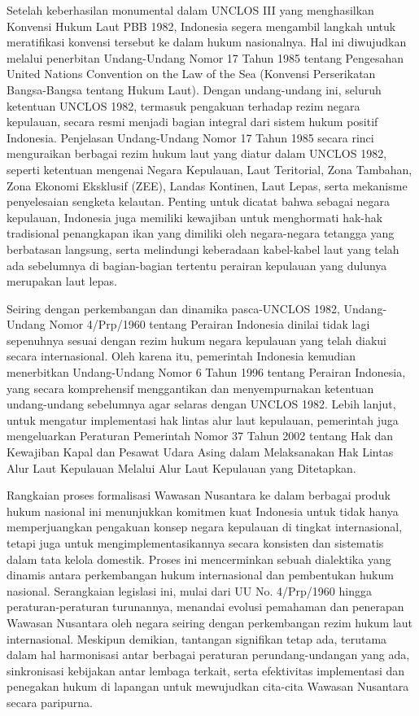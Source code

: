 \documentclass[12pt, a4paper]{article}
\begin{document}
Setelah keberhasilan monumental dalam UNCLOS III yang menghasilkan Konvensi Hukum Laut PBB 1982, Indonesia segera mengambil langkah untuk meratifikasi konvensi tersebut ke dalam hukum nasionalnya. Hal ini diwujudkan melalui penerbitan Undang-Undang Nomor 17 Tahun 1985 tentang Pengesahan United Nations Convention on the Law of the Sea (Konvensi Perserikatan Bangsa-Bangsa tentang Hukum Laut). Dengan undang-undang ini, seluruh ketentuan UNCLOS 1982, termasuk pengakuan terhadap rezim negara kepulauan, secara resmi menjadi bagian integral dari sistem hukum positif Indonesia. Penjelasan Undang-Undang Nomor 17 Tahun 1985 secara rinci menguraikan berbagai rezim hukum laut yang diatur dalam UNCLOS 1982, seperti ketentuan mengenai Negara Kepulauan, Laut Teritorial, Zona Tambahan, Zona Ekonomi Eksklusif (ZEE), Landas Kontinen, Laut Lepas, serta mekanisme penyelesaian sengketa kelautan. Penting untuk dicatat bahwa sebagai negara kepulauan, Indonesia juga memiliki kewajiban untuk menghormati hak-hak tradisional penangkapan ikan yang dimiliki oleh negara-negara tetangga yang berbatasan langsung, serta melindungi keberadaan kabel-kabel laut yang telah ada sebelumnya di bagian-bagian tertentu perairan kepulauan yang dulunya merupakan laut lepas.  

Seiring dengan perkembangan dan dinamika pasca-UNCLOS 1982, Undang-Undang Nomor 4/Prp/1960 tentang Perairan Indonesia dinilai tidak lagi sepenuhnya sesuai dengan rezim hukum negara kepulauan yang telah diakui secara internasional. Oleh karena itu, pemerintah Indonesia kemudian menerbitkan Undang-Undang Nomor 6 Tahun 1996 tentang Perairan Indonesia, yang secara komprehensif menggantikan dan menyempurnakan ketentuan undang-undang sebelumnya agar selaras dengan UNCLOS 1982. Lebih lanjut, untuk mengatur implementasi hak lintas alur laut kepulauan, pemerintah juga mengeluarkan Peraturan Pemerintah Nomor 37 Tahun 2002 tentang Hak dan Kewajiban Kapal dan Pesawat Udara Asing dalam Melaksanakan Hak Lintas Alur Laut Kepulauan Melalui Alur Laut Kepulauan yang Ditetapkan.  

Rangkaian proses formalisasi Wawasan Nusantara ke dalam berbagai produk hukum nasional ini menunjukkan komitmen kuat Indonesia untuk tidak hanya memperjuangkan pengakuan konsep negara kepulauan di tingkat internasional, tetapi juga untuk mengimplementasikannya secara konsisten dan sistematis dalam tata kelola domestik. Proses ini mencerminkan sebuah dialektika yang dinamis antara perkembangan hukum internasional dan pembentukan hukum nasional. Serangkaian legislasi ini, mulai dari UU No. 4/Prp/1960 hingga peraturan-peraturan turunannya, menandai evolusi pemahaman dan penerapan Wawasan Nusantara oleh negara seiring dengan perkembangan rezim hukum laut internasional. Meskipun demikian, tantangan signifikan tetap ada, terutama dalam hal harmonisasi antar berbagai peraturan perundang-undangan yang ada, sinkronisasi kebijakan antar lembaga terkait, serta efektivitas implementasi dan penegakan hukum di lapangan untuk mewujudkan cita-cita Wawasan Nusantara secara paripurna.
\end{document}
